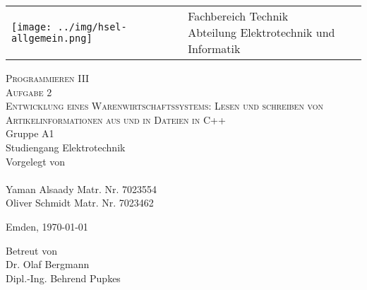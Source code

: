 \begin{titlepage}

\vspace{-0.5cm}
\hspace{-0.5cm}
\begin{tabular}{p{8.0cm} p{8.0cm}}
  \texttt{[image: ../img/hsel-allgemein.png]} &
   \parbox[b]{8.0cm}{
     {\large 	Fachbereich Technik }\\
     {\large 	Abteilung Elektrotechnik und Informatik }     
    } \\
   \\
   \hline
\end{tabular}
%
\begin{center}

\vspace{2.5cm}
\LARGE{\textsc{
    Programmieren III\\ Aufgabe 2
}}\\

\vspace{2.5cm}
\LARGE{\textsc{
{Entwicklung eines Warenwirtschaftssystems: Lesen und schreiben von Artikelinformationen aus und in Dateien in C++}
}}\\

\vspace{2cm}%
\large
Gruppe A1\\
Studiengang Elektrotechnik\\
Vorgelegt von\\\ \\
Yaman Alsaady\hspace{2cm} Matr. Nr. 7023554\\
Oliver Schmidt\hspace{2cm} Matr. Nr. 7023462


\vspace{1cm} 
Emden, \today

\vspace{3.5cm}%
Betreut von\\ Dr. Olaf Bergmann\\Dipl.-Ing. Behrend Pupkes

\end{center}
\normalsize
\end{titlepage}
